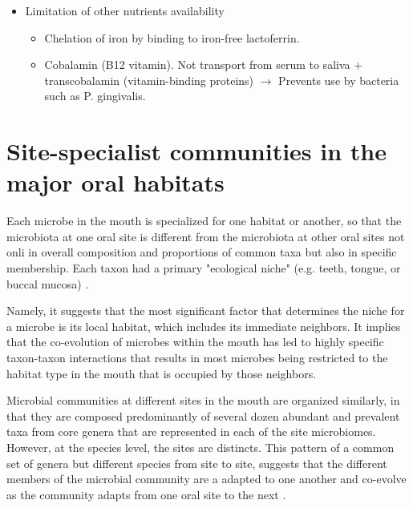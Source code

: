 \begin{tcolorbox}[breakable,
    title=Saliva,
    title filled=false,
    colback=blue!5!white,
    colframe=blue!75!black]
\begin{itemize}
\begin{itemize}
        \end{itemize}
        \item Limitation of other nutrients availability
        \begin{itemize}
            \item Chelation of iron by binding to iron-free lactoferrin. 
            \item Cobalamin (B12 vitamin). Not transport from serum to saliva + transcobalamin 
            (vitamin-binding proteins) $\rightarrow$ Prevents use by bacteria such as P. gingivalis. 
        \end{itemize}
    \end{itemize}
\end{tcolorbox}

\section{Site-specialist communities in the major oral habitats}

\begin{definition}
    Each microbe in the mouth is specialized for one habitat or another, so that the microbiota at one oral site is different 
from the microbiota at other oral sites not onli in overall composition and proportions of common taxa but also in specific 
membership. Each taxon had a primary "ecological niche" (e.g. teeth, tongue, or buccal mucosa) \cite{Welch2020}.
\end{definition}

Namely, it suggests that the most significant factor that determines the niche for a microbe is its local habitat, which 
includes its immediate neighbors. It implies that the co-evolution of microbes within the mouth has led to highly specific 
taxon-taxon interactions that results in most microbes being restricted to the habitat type in the mouth that is occupied 
by those neighbors.

Microbial communities at different sites in the mouth are organized similarly, in that they are composed predominantly of 
several dozen abundant and prevalent taxa from core genera that are represented in each of the site microbiomes. However, 
at the species level, the sites are distincts. This pattern of a common set of genera but different species from site to 
site, suggests that the different members of the microbial community are a adapted to one another and co-evolve as the 
community adapts from one oral site to the next \cite{Welch2020}. 


